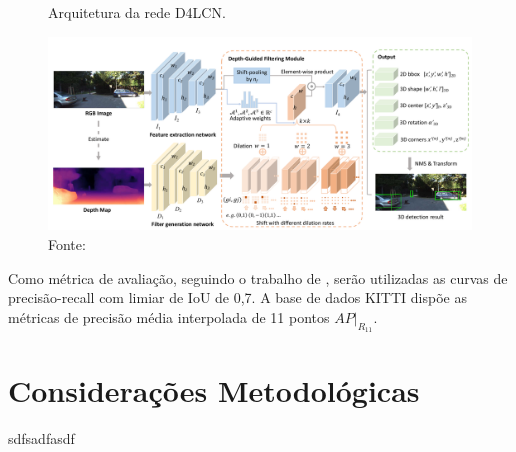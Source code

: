 \begin{figure}[H]
    \centering
    \caption{Arquitetura da rede D4LCN. }
    \includegraphics[width=\textwidth]{fig/d4lcn.png}
    \caption*{Fonte: \cite{ding2020learning}}
    \label{fig:d4lcn}
\end{figure}

Como métrica de avaliação, seguindo o trabalho de , serão utilizadas as curvas de precisão-recall com limiar de IoU de 0,7. A base de dados KITTI dispõe as métricas de precisão média interpolada de 11 pontos $AP|_{R_{11}}$.

\section{Considerações Metodológicas}

sdfsadfasdf